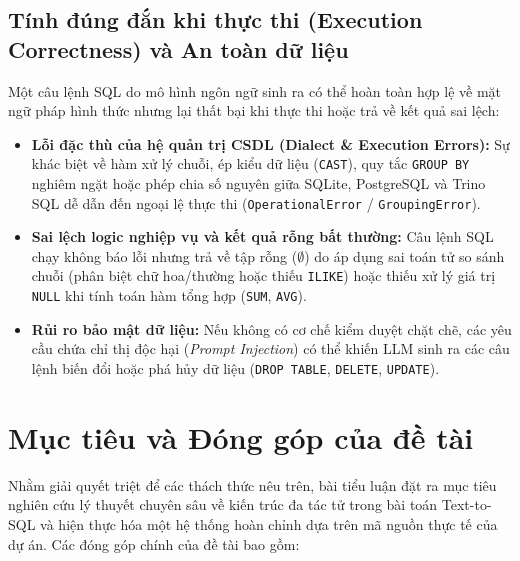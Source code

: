 \documentclass[12pt,a4paper]{report}
\begin{document}
\subsection{Tính đúng đắn khi thực thi (Execution Correctness) và An toàn dữ liệu}
Một câu lệnh SQL do mô hình ngôn ngữ sinh ra có thể hoàn toàn hợp lệ về mặt ngữ pháp hình thức nhưng lại thất bại khi thực thi hoặc trả về kết quả sai lệch:
\begin{itemize}
    \item \textbf{Lỗi đặc thù của hệ quản trị CSDL (Dialect \& Execution Errors):} Sự khác biệt về hàm xử lý chuỗi, ép kiểu dữ liệu (\texttt{CAST}), quy tắc \texttt{GROUP BY} nghiêm ngặt hoặc phép chia số nguyên giữa SQLite, PostgreSQL và Trino SQL dễ dẫn đến ngoại lệ thực thi (\texttt{OperationalError} / \texttt{GroupingError}).
    \item \textbf{Sai lệch logic nghiệp vụ và kết quả rỗng bất thường:} Câu lệnh SQL chạy không báo lỗi nhưng trả về tập rỗng ($\emptyset$) do áp dụng sai toán tử so sánh chuỗi (phân biệt chữ hoa/thường hoặc thiếu \texttt{ILIKE}) hoặc thiếu xử lý giá trị \texttt{NULL} khi tính toán hàm tổng hợp (\texttt{SUM}, \texttt{AVG}).
    \item \textbf{Rủi ro bảo mật dữ liệu:} Nếu không có cơ chế kiểm duyệt chặt chẽ, các yêu cầu chứa chỉ thị độc hại (\textit{Prompt Injection}) có thể khiến LLM sinh ra các câu lệnh biến đổi hoặc phá hủy dữ liệu (\texttt{DROP TABLE}, \texttt{DELETE}, \texttt{UPDATE}).
\end{itemize}

\section{Mục tiêu và Đóng góp của đề tài}

Nhằm giải quyết triệt để các thách thức nêu trên, bài tiểu luận đặt ra mục tiêu nghiên cứu lý thuyết chuyên sâu về kiến trúc đa tác tử trong bài toán Text-to-SQL và hiện thực hóa một hệ thống hoàn chỉnh dựa trên mã nguồn thực tế của dự án. Các đóng góp chính của đề tài bao gồm:
\end{document}
